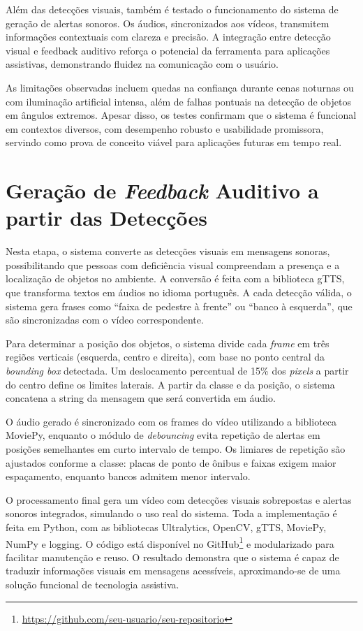 Além das detecções visuais, também é testado o funcionamento do sistema de geração de alertas sonoros. Os áudios, sincronizados aos vídeos, transmitem informações contextuais com clareza e precisão. A integração entre detecção visual e feedback auditivo reforça o potencial da ferramenta para aplicações assistivas, demonstrando fluidez na comunicação com o usuário.

As limitações observadas incluem quedas na confiança durante cenas noturnas ou com iluminação artificial intensa, além de falhas pontuais na detecção de objetos em ângulos extremos. Apesar disso, os testes confirmam que o sistema é funcional em contextos diversos, com desempenho robusto e usabilidade promissora, servindo como prova de conceito viável para aplicações futuras em tempo real.

\section{Geração de \textit{Feedback} Auditivo a partir das Detecções}

Nesta etapa, o sistema converte as detecções visuais em mensagens sonoras, possibilitando que pessoas com deficiência visual compreendam a presença e a localização de objetos no ambiente. A conversão é feita com a biblioteca gTTS, que transforma textos em áudios no idioma português. A cada detecção válida, o sistema gera frases como “faixa de pedestre à frente” ou “banco à esquerda”, que são sincronizadas com o vídeo correspondente.

Para determinar a posição dos objetos, o sistema divide cada \textit{frame} em três regiões verticais (esquerda, centro e direita), com base no ponto central da \textit{bounding box} detectada. Um deslocamento percentual de 15\% dos \textit{pixels} a partir do centro define os limites laterais. A partir da classe e da posição, o sistema concatena a string da mensagem que será convertida em áudio.

O áudio gerado é sincronizado com os frames do vídeo utilizando a biblioteca MoviePy, enquanto o módulo de \textit{debouncing} evita repetição de alertas em posições semelhantes em curto intervalo de tempo. Os limiares de repetição são ajustados conforme a classe: placas de ponto de ônibus e faixas exigem maior espaçamento, enquanto bancos admitem menor intervalo.

O processamento final gera um vídeo com detecções visuais sobrepostas e alertas sonoros integrados, simulando o uso real do sistema. Toda a implementação é feita em Python, com as bibliotecas Ultralytics, OpenCV, gTTS, MoviePy, NumPy e logging. O código está disponível no GitHub\footnote{\url{https://github.com/seu-usuario/seu-repositorio}} e modularizado para facilitar manutenção e reuso. O resultado demonstra que o sistema é capaz de traduzir informações visuais em mensagens acessíveis, aproximando-se de uma solução funcional de tecnologia assistiva.

